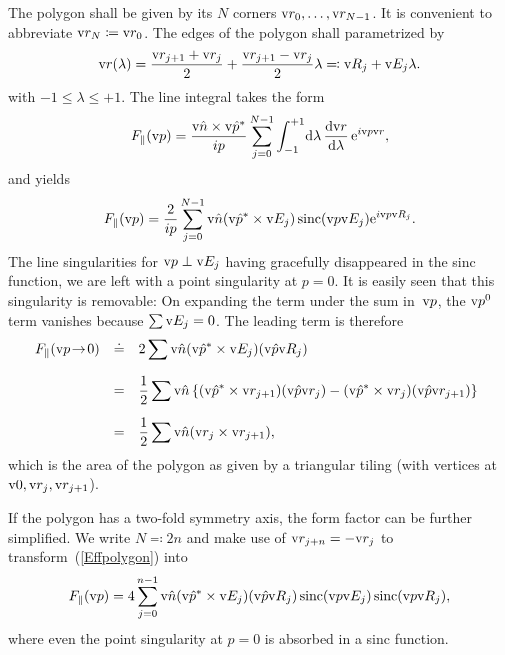 The polygon shall be given by its $N$ corners $\text{v}{r}_0,\ldots,\text{v}{r}_{N-1}$.
It is convenient to abbreviate $\text{v}{r}_N\coloneqq\text{v}{r}_0$.
The edges of the polygon shall parametrized by
\begin{equation}
  \text{v}{r}(\lambda) = \frac{\text{v}{r}_{j+1}+\text{v}{r}_j}{2} + \frac{\text{v}{r}_{j+1}-\text{v}{r}_j}{2} \lambda
  \eqqcolon \text{v}{R}_j + \text{v}{E}_j\lambda.
\end{equation}
with $-1\le\lambda\le+1$.
The line integral takes the form
\begin{equation}
    F_\parallel(\text{v}{p})
   = \frac{\text{v}{\hat n}\times\text{v}{\hat p}^*}{ip} \sum_{j=0}^{N-1}
              \int_{-1}^{+1}\!\text{d}\lambda\, \frac{\text{d}\text{v}{r}}{\text{d}\lambda}\,\text{e}^{i\text{v}{p}\text{v}{r}},
\end{equation}
and yields
\begin{equation}\label{Effpolygon}
    F_\parallel(\text{v}{p})
    = \frac{2}{ip} \sum_{j=0}^{N-1} \text{v}{\hat n}(\text{v}{\hat p}^*\times\text{v}{E}_j) \operatorname{sinc}(\text{v}{p}\text{v}{E}_j) \text{e}^{i\text{v}{p}\text{v}{R}_j}.
\end{equation}
The line singularities for $\text{v}{p}\perp\text{v}{E}_j$ having gracefully disappeared in the
sinc function,
we are left with a point singularity at $p=0$.
It is easily seen that this singularity is removable:
On expanding the term under the sum in~$\text{v}{p}$,
the $\text{v}{p}^0$ term vanishes because $\sum\text{v}{E}_j=0$.
The leading term is therefore
\begin{equation}
  \begin{array}{@{}lcl}
  F_\parallel(\qp\!\to\!0)
    &\doteq& \displaystyle 2\sum \n(\uqp^*\times\E_j) (\uqp\R_j)\\[3ex]
    &=&\displaystyle \frac{1}{2}\sum \n\left\{
        (\uqp^*\times\r_{j+1})(\uqp\r_j)
      - (\uqp^*\times\r_j)(\uqp\r_{j+1})
      \right\}\\[3ex]
    &=&\displaystyle \frac{1}{2}\sum \n(\r_j\times\r_{j+1}),
  \end{array}
\end{equation}
which is the area of the polygon
as given by a triangular tiling (with vertices at $\text{v}{0},\text{v}{r}_j,\text{v}{r}_{j+1}$).

If the polygon has a two-fold symmetry axis,
the form factor can be further simplified.
We write $N\eqqcolon2n$
and make use of $\text{v}{r}_{j+n}=-\text{v}{r}_j$ to transform~(\ref{Effpolygon}) into
\begin{equation}\label{Eff2ngon}
    F_\parallel(\text{v}{p}) = \displaystyle 4 \sum_{j=0}^{n-1}
              \text{v}{\hat n}(\text{v}{\hat p}^*\times\text{v}{E}_j) (\text{v}{\hat p}\text{v}{R}_j) \operatorname{sinc}(\text{v}{p}\text{v}{E}_j) \operatorname{sinc}(\text{v}{p}\text{v}{R}_j),
\end{equation}
where even the point singularity at $p=0$ is absorbed in a sinc function.
%
%

